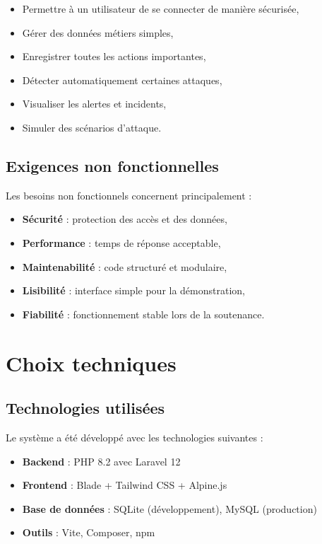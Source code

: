 \documentclass[a4paper,12pt]{report}
\begin{document}
    \begin{itemize}
        \item Permettre à un utilisateur de se connecter de manière sécurisée,
        \item Gérer des données métiers simples,
        \item Enregistrer toutes les actions importantes,
        \item Détecter automatiquement certaines attaques,
        \item Visualiser les alertes et incidents,
        \item Simuler des scénarios d'attaque.
    \end{itemize}
    
    \subsection{Exigences non fonctionnelles}
    
    Les besoins non fonctionnels concernent principalement :
    
    \begin{itemize}
        \item \textbf{Sécurité} : protection des accès et des données,
        \item \textbf{Performance} : temps de réponse acceptable,
        \item \textbf{Maintenabilité} : code structuré et modulaire,
        \item \textbf{Lisibilité} : interface simple pour la démonstration,
        \item \textbf{Fiabilité} : fonctionnement stable lors de la soutenance.
    \end{itemize}
    
    \section{Choix techniques}
    
    \subsection{Technologies utilisées}
    
    Le système a été développé avec les technologies suivantes :
    
    \begin{itemize}
        \item \textbf{Backend} : PHP 8.2 avec Laravel 12
        \item \textbf{Frontend} : Blade + Tailwind CSS + Alpine.js
        \item \textbf{Base de données} : SQLite (développement), MySQL (production)
        \item \textbf{Outils} : Vite, Composer, npm
    \end{itemize}
    
\end{document}

